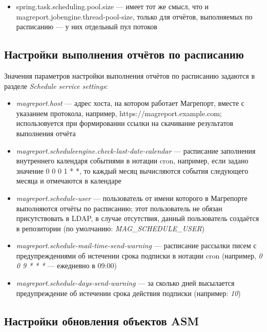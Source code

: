\documentclass[../user-manual.tex]{subfiles}
\begin{document}
	\begin{itemize}
		\item spring.task.scheduling.pool.size --- имеет тот же смысл, что и magreport.jobengine.thread-pool-size, только для отчётов, выполняемых по расписанию --- у них отдельный пул потоков
	\end{itemize}
	
	\subsection{Настройки выполнения отчётов по расписанию} \label{subsection:schedule-service-settings}
	
	Значения параметров настройки выполнения отчётов по расписанию задаются в разделе \textit{Schedule service settings}:
	
	\begin{itemize}
		\item \textit{magreport.host} --- адрес хоста, на котором работает Магрепорт, вместе с указанием протокола, например, https://magreport.example.com; использовуется при формировании ссылки на скачивание результатов выполнения отчёта
		
		\item \textit{magreport.scheduleengine.check-last-date-calendar} --- расписание заполнения внутреннего календаря событиями в нотации cron, например, если задано значение 0 0 0 1 * *, то каждый месяц вычисляются события следующего месяца и отмечаются в календаре
		
		\item \textit{magreport.schedule-user} --- пользователь от имени которого в Магрепорте выполняются отчёты по расписанию; этот пользователь не обязан присутствовать в LDAP, в случае отсутствия, данный пользователь создаётся в репозитории (по умолчанию: \textit{MAG\_SCHEDULE\_USER})
		
		\item \textit{magreport.schedule-mail-time-send-warning} --- расписание рассылки писем с предупреждениями об истечении срока подписки в нотации cron (например, \textit{0 0 9 * * *} --- ежедневно в 09:00)
		
		\item \textit{magreport.schedule-days-send-warning} --- за сколько дней высылается предупреждение об истечении срока действия подписки (например: \textit{10})
		
	\end{itemize}
	
	\subsection{Настройки обновления объектов ASM}\label{subsection:asm-properties}
	
\end{document}
